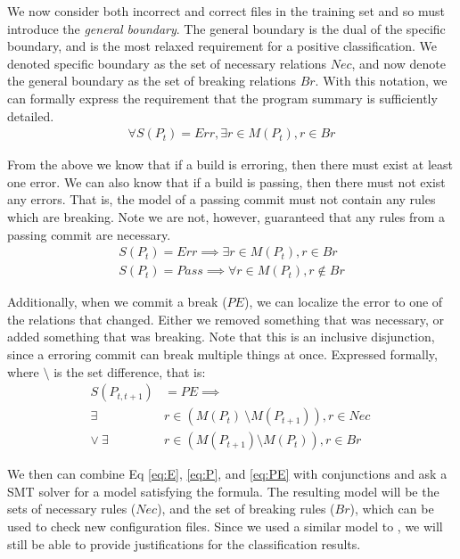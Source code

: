 We now consider both incorrect and correct files in the training set 
and so must introduce the \textit{general boundary}.
The general boundary is the dual of the specific boundary, and is the most relaxed requirement for a positive classification.
We denoted specific boundary as the set of necessary relations $Nec$, and now denote the general boundary as the set of breaking relations $Br$.
With this notation, we can formally express the requirement that the program summary is sufficiently detailed.
\begin{align}
  \forall S(P_t)=Err, \exists r \in M(P_t), r \in Br \label{eq:E1}
\end{align}

From the above we know that if a build is erroring, then there must exist at least one error.
We can also know that if a build is passing, then there must not exist any errors.
That is, the model of a passing commit must not contain any rules which are breaking.
Note we are not, however, guaranteed that any rules from a passing commit are necessary.
\begin{align}
  S(P_t) = Err \implies \exists r \in  M (P_t), r \in Br \label{eq:E}\\
  S(P_t) = Pass \implies \forall r \in  M (P_t), r \notin Br \label{eq:P}
\end{align}

Additionally, when we commit a break ($PE$), we can localize the error to one of the relations that changed.
Either we removed something that was necessary, or added something that was breaking.
Note that this is an inclusive disjunction, since a erroring commit can break multiple things at once.
Expressed formally, where $\setminus$ is the set difference, that is:
\begin{align}
  S(P_{t,t+1}) &= PE \implies \nonumber \\
  \exists& r \in (M(P_{t})\ \setminus M(P_{t+1})), r \in Nec\ \nonumber \\
  \lor \ \exists& r \in (M(P_{t+1}) \setminus M(P_{t})), r \in Br \label{eq:PE}
\end{align}

We then can combine Eq \ref{eq:E}, \ref{eq:P}, and \ref{eq:PE} with
conjunctions and ask a SMT solver for a model satisfying the formula.
The resulting model will be the sets of necessary rules ($Nec$), and the set of breaking rules ($Br$), which can be used to check new configuration files.
Since we used a similar model to \app, we will still be able to provide justifications for the classification results.

